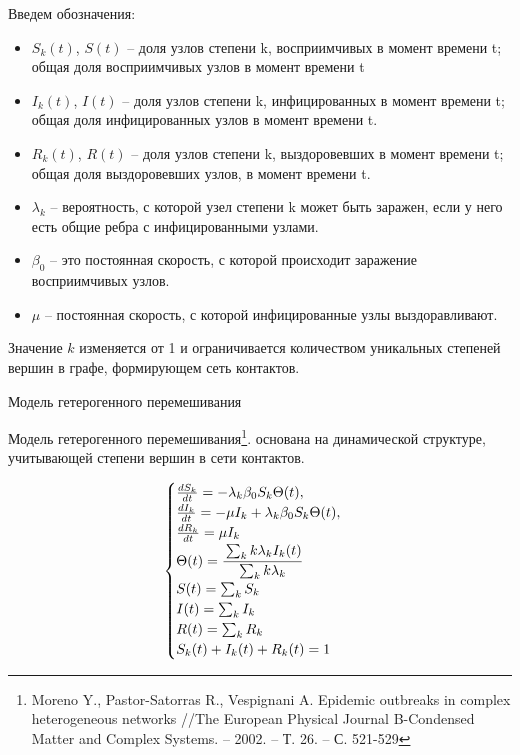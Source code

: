 \documentclass[10pt, unicode, xcolor={svgnames, table, hyperref}]{beamer}
\begin{document}
\begin{frame}[fragile,t]{}
	Введем обозначения:
	\begin{itemize}
	
		\item $S_k(t)$, $S(t)$ -- доля узлов степени k, восприимчивых в момент времени t; общая доля восприимчивых узлов в момент времени t
		\item$I_k(t)$, $I(t)$ -- доля узлов степени k, инфицированных в момент времени t; общая доля инфицированных узлов	в момент времени t.
		\item $R_k(t)$, $R(t)$ -- доля узлов степени k, выздоровевших в момент времени t; общая доля выздоровевших узлов, в момент времени t.
		\item $\lambda_k$ -- вероятность, с которой узел степени k может быть заражен, если у него есть общие ребра с инфицированными узлами.
		\item $\beta_0$ -- это постоянная скорость, с которой происходит заражение восприимчивых узлов.
		\item $\mu$ -- постоянная скорость, с которой инфицированные узлы выздоравливают.
	
	\end{itemize}

	Значение $k$ изменяется от 1 и ограничивается количеством уникальных степеней вершин в графе, формирующем сеть контактов.
\end{frame}




\begin{frame}[fragile,t]{}
	
	\vspace{0.5cm}
	\textcolor{DarkBlue!80!LightBlue}{Модель гетерогенного перемешивания}
	\vspace{0.2cm}
	
    Модель гетерогенного перемешивания\footnote{Moreno Y., Pastor-Satorras R., Vespignani A. Epidemic outbreaks in complex heterogeneous networks //The European Physical Journal B-Condensed Matter and Complex Systems. – 2002. – Т. 26. – С. 521-529}.  основана на динамической структуре, учитывающей степени вершин в сети
	контактов.
	
	\begin{equation}
		\begin{cases}
			\frac{d S_k}{d t} = -\lambda_k \beta_0 S_k \Theta(t), \\
			\frac{d I_k}{d t} = -\mu I_k + \lambda_k \beta_0 S_k \Theta(t), \\
			\frac{d R_k}{d t} = \mu I_k \\
			\Theta(t)=\cfrac{\sum_{k} k \lambda_{k} I_{k}(t)}{\sum_{k} k \lambda_{k}} \\
			S(t)=\sum_{k} S_{k} \\
			I(t)=\sum_{k} I_{k} \\
			R(t)=\sum_{k} R_{k} \\
			S_k(t) + I_k(t) + R_k(t) = 1
		\end{cases}
		\label{eq:SIR_system_base_groups}
	\end{equation}

	
\end{frame}
\end{document}
